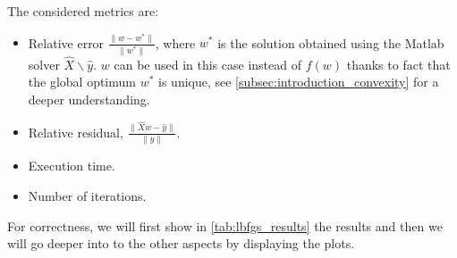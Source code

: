 \noindent The considered metrics are:
\begin{itemize}
    \item Relative error $\frac{\lVert w-w^*\rVert}{\lVert w^*\rVert}$, where $w^*$ is the solution obtained using the Matlab solver $\hat{X}\backslash\hat{y}$. $w$ can be used in this case instead of $f(w)$ thanks to fact that the global optimum $w^*$ is unique, see \ref{subsec:introduction_convexity} for a deeper understanding.
    \item Relative residual, $\frac{\lVert \hat{X}w-\hat{y} \rVert}{\lVert \hat{y} \rVert}$.
    \item Execution time.
    \item Number of iterations.
\end{itemize}
For correctness, we will first show in \autoref{tab:lbfgs_results} the results and then we will go deeper into to the other aspects by displaying the plots.
